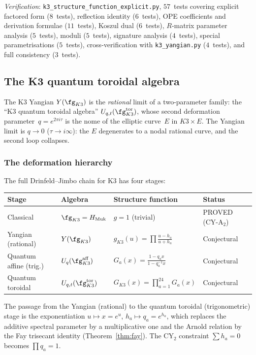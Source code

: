 \noindent\textit{Verification}:
\texttt{k3\_structure\_function\_explicit.py},
$57$~tests covering explicit factored form ($8$~tests),
reflection identity ($6$~tests), OPE coefficients and
derivation formulae ($11$~tests), Koszul dual ($6$~tests),
$R$-matrix parameter analysis ($5$~tests), moduli ($5$~tests),
signature analysis ($4$~tests), special parametrisations ($5$~tests),
cross-verification with \texttt{k3\_yangian.py} ($4$~tests),
and full consistency ($3$~tests).



\subsection{The K3 quantum toroidal algebra}
\label{subsec:k3-quantum-toroidal}

The K3 Yangian $Y(\fg_{K3})$ is the \emph{rational} limit of a
two-parameter family: the ``K3 quantum toroidal algebra''
$U_{q,t}(\fg_{K3}^{\mathrm{tor}})$, whose second deformation
parameter~$q = e^{2\pi i \tau}$ is the nome of the elliptic curve~$E$
in $K3 \times E$.  The Yangian limit is $q \to 0$
($\tau \to i\infty$): the $E$ degenerates to a nodal rational curve,
and the second loop collapses.

\subsubsection{The deformation hierarchy}

The full Drinfeld--Jimbo chain for K3 has four stages:
\begin{center}
\small
\renewcommand{\arraystretch}{1.3}
\begin{tabular}{llll}
\toprule
\textbf{Stage} & \textbf{Algebra} & \textbf{Structure function} & \textbf{Status} \\
\midrule
Classical & $\fg_{K3} = H_{\mathrm{Muk}}$ & $g = 1$ (trivial) & PROVED (CY-A$_2$) \\
Yangian (rational) & $Y(\fg_{K3})$ & $g_{K3}(u) = \prod \frac{u - h_a}{u + h_a}$ & Conjectural \\
Quantum affine (trig.) & $U_q(\fg_{K3}^{\mathrm{aff}})$ & $G_a(x) = \frac{1 - q_a x}{1 - q_a^{-1} x}$ & Conjectural \\
Quantum toroidal & $U_{q,t}(\fg_{K3}^{\mathrm{tor}})$ & $G_{K3}(x) = \prod_{a=1}^{24} G_a(x)$ & Conjectural \\
\bottomrule
\end{tabular}
\end{center}
The passage from the Yangian (rational) to the quantum toroidal
(trigonometric) stage is the exponentiation
$u \mapsto x = e^u$, $h_a \mapsto q_a = e^{h_a}$,
which replaces the additive spectral parameter by a multiplicative
one and the Arnold relation by the Fay trisecant identity
(Theorem~\ref{thm:fay}).  The CY$_2$ constraint
$\sum h_a = 0$ becomes $\prod q_a = 1$.

